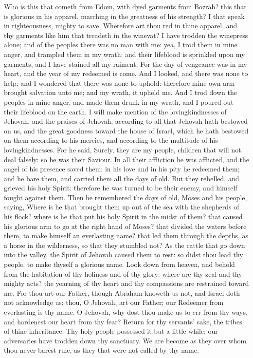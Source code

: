Who is this that cometh from Edom, with dyed garments from Bozrah? this that is glorious in his apparel, marching in the greatness of his strength? I that speak in righteousness, mighty to save. Wherefore art thou red in thine apparel, and thy garments like him that treadeth in the winevat? I have trodden the winepress alone; and of the peoples there was no man with me: yea, I trod them in mine anger, and trampled them in my wrath; and their lifeblood is sprinkled upon my garments, and I have stained all my raiment. For the day of vengeance was in my heart, and the year of my redeemed is come. And I looked, and there was none to help; and I wondered that there was none to uphold: therefore mine own arm brought salvation unto me; and my wrath, it upheld me. And I trod down the peoples in mine anger, and made them drunk in my wrath, and I poured out their lifeblood on the earth.  I will make mention of the lovingkindnesses of Jehovah, and the praises of Jehovah, according to all that Jehovah hath bestowed on us, and the great goodness toward the house of Israel, which he hath bestowed on them according to his mercies, and according to the multitude of his lovingkindnesses. For he said, Surely, they are my people, children that will not deal falsely: so he was their Saviour. In all their affliction he was afflicted, and the angel of his presence saved them: in his love and in his pity he redeemed them; and he bare them, and carried them all the days of old.  But they rebelled, and grieved his holy Spirit: therefore he was turned to be their enemy, and himself fought against them. Then he remembered the days of old, Moses and his people, saying, Where is he that brought them up out of the sea with the shepherds of his flock? where is he that put his holy Spirit in the midst of them? that caused his glorious arm to go at the right hand of Moses? that divided the waters before them, to make himself an everlasting name? that led them through the depths, as a horse in the wilderness, so that they stumbled not? As the cattle that go down into the valley, the Spirit of Jehovah caused them to rest: so didst thou lead thy people, to make thyself a glorious name.  Look down from heaven, and behold from the habitation of thy holiness and of thy glory: where are thy zeal and thy mighty acts? the yearning of thy heart and thy compassions are restrained toward me. For thou art our Father, though Abraham knoweth us not, and Israel doth not acknowledge us: thou, O Jehovah, art our Father; our Redeemer from everlasting is thy name. O Jehovah, why dost thou make us to err from thy ways, and hardenest our heart from thy fear? Return for thy servants’ sake, the tribes of thine inheritance. Thy holy people possessed it but a little while: our adversaries have trodden down thy sanctuary. We are become as they over whom thou never barest rule, as they that were not called by thy name. 

